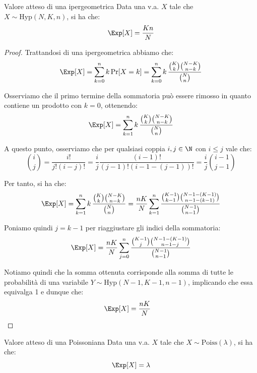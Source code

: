 \documentclass[a4paper, 12pt]{report}
\begin{document}
    \begin{framedprop}{Valore atteso di una ipergeometrica}
        Data una v.a. $X$ tale che $X \sim \mathrm{Hyp}(N,K,n)$, si ha che:
        \[\Exp[X] = \frac{Kn}{N}\]
    \end{framedprop}

    \begin{proof}
        Trattandosi di una ipergeometrica abbiamo che:
        \[\begin{split}
            \Exp[X] &= \sum_{k = 0}^n k \Pr[X = k] = \sum_{k = 0}^n k \, \frac{\binom{K}{k} \binom{N-K}{n-k}}{\binom{N}{n}} \\
        \end{split}\]

        Osserviamo che il primo termine della sommatoria può essere rimosso in quanto contiene un prodotto con $k = 0$, ottenendo:
        \[\Exp[X] = \sum_{k = 1}^n k \, \frac{\binom{K}{k} \binom{N-K}{n-k}}{\binom{N}{n}}\]

        A questo punto, osserviamo che per qualsiasi coppia $i,j \in \N$ con $i \leq j$ vale che:
        \[\binom{i}{j} = \frac{i!}{j! (i-j)!} = \frac{i}{j} \frac{(i-1)!}{(j-1)! (i-1-(j-1))!} = \frac{i}{j} \binom{i-1}{j-1}\]

        Per tanto, si ha che:
        \[\begin{split}
            \Exp[X] &= \sum_{k = 1}^n k \, \frac{\binom{K}{k} \binom{N-K}{n-k}}{\binom{N}{n}} = \frac{nK}{N} \sum_{k = 1}^n \frac{\binom{K-1}{k-1} \binom{N-1-(K-1)}{n-1-(k-1)}}{\binom{N-1}{n-1}}\\
        \end{split}\]

        Poniamo quindi $j = k-1$ per riaggiustare gli indici della sommatoria:
        \[\begin{split}
            \Exp[X] &= \frac{nK}{N} \sum_{j = 0}^n \frac{\binom{K-1}{j} \binom{N-1-(K-1)}{n-1-j}}{\binom{N-1}{n-1}}\\
        \end{split}\]

        Notiamo quindi che la somma ottenuta corrisponde alla somma di tutte le probabilità di una variabile $Y \sim \mathrm{Hyp}(N-1, K-1, n-1)$, implicando che essa equivalga 1 e dunque che:
        \[\begin{split}
            \Exp[X] &= \frac{nK}{N}
        \end{split}\]
    \end{proof}


    \begin{framedprop}{Valore atteso di una Poissoniana}
        Data una v.a. $X$ tale che $X \sim \mathrm{Poiss}(\lambda)$, si ha che:
        \[\Exp[X] = \lambda\]
    \end{framedprop}
    
\end{document}
